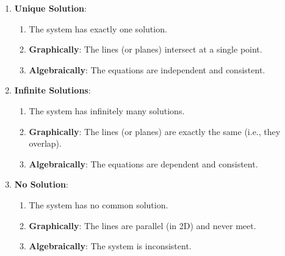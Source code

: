 \begin{enumerate}

\item \textbf{Unique Solution}:
\begin{enumerate}
    \item The system has exactly one solution.
    \hfill \cite{common/online/chatgpt}

    \item \textbf{Graphically}: The lines (or planes) intersect at a single point.
    \hfill \cite{common/online/chatgpt}

    \item \textbf{Algebraically}: The equations are independent and consistent.
    \hfill \cite{common/online/chatgpt}
\end{enumerate}

\item \textbf{Infinite Solutions}:
\begin{enumerate}
    \item The system has infinitely many solutions.
    \hfill \cite{common/online/chatgpt}

    \item \textbf{Graphically}: The lines (or planes) are exactly the same (i.e., they overlap).
    \hfill \cite{common/online/chatgpt}

    \item \textbf{Algebraically}: The equations are dependent and consistent.
    \hfill \cite{common/online/chatgpt}
\end{enumerate}

\item \textbf{No Solution}:
\begin{enumerate}
    \item The system has no common solution.
    \hfill \cite{common/online/chatgpt}

    \item \textbf{Graphically}: The lines are parallel (in 2D) and never meet.
    \hfill \cite{common/online/chatgpt}

    \item \textbf{Algebraically}: The system is inconsistent.
    \hfill \cite{common/online/chatgpt}
\end{enumerate}

\end{enumerate}












